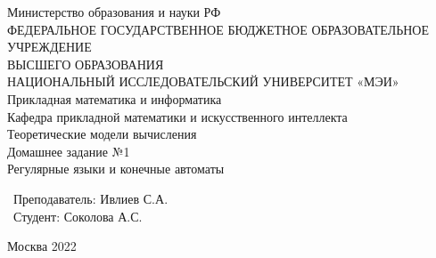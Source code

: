 \documentclass[a4paper]{article}
\begin{document}
\begin{center}
\hfill \break
\large{Министерство образования и науки РФ}\\
\large{ФЕДЕРАЛЬНОЕ ГОСУДАРСТВЕННОЕ БЮДЖЕТНОЕ ОБРАЗОВАТЕЛЬНОЕ УЧРЕЖДЕНИЕ}\\ 
\large{ВЫСШЕГО ОБРАЗОВАНИЯ}\\
\large{НАЦИОНАЛЬНЫЙ ИССЛЕДОВАТЕЛЬСКИЙ УНИВЕРСИТЕТ «МЭИ»}\\
\hfill \break
\normalsize{Прикладная математика и информатика}\\
 \hfill \break
\normalsize{Кафедра прикладной математики и искусственного интеллекта}\\
\hfill\break
\hfill \break
\hfill \break
\hfill \break
\large{Теоретические модели вычисления}\\
\hfill \break
\large{Домашнее задание №1}\\
\large{Регулярные языки и конечные автоматы}\\
\hfill \break
\hfill \break
\hfill \break
\hfill \break
\hfill \break
\hfill \break
\end{center}
 
\normalsize{ 
\begin{flushright}
\ Преподаватель: Ивлиев С.А. \\
\ Студент: Соколова А.С. \
\end{flushright}
\hfill \break
\hfill \break
\hfill \break
\hfill \break
\hfill \break
\begin{center} Москва 2022 \end{center}
\thispagestyle{empty} %
} 

\newpage
    \tableofcontents %
\newpage
 
\newpage
\end{document}

